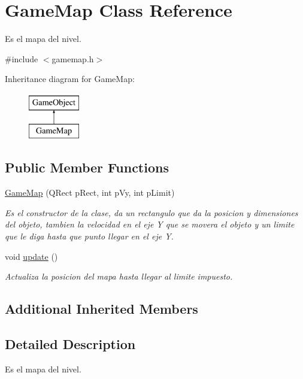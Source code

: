 \hypertarget{class_game_map}{\section{Game\-Map Class Reference}
\label{class_game_map}
}


Es el mapa del nivel.  




{\ttfamily \#include $<$gamemap.\-h$>$}

Inheritance diagram for Game\-Map\-:\begin{figure}[H]
\begin{center}
\leavevmode
\includegraphics[height=2.000000cm]{class_game_map}
\end{center}
\end{figure}
\subsection*{Public Member Functions}
\begin{DoxyCompactItemize}
\item 
\hyperlink{class_game_map_aa62bdfa76f7c48dc6b384870491747c7}{Game\-Map} (Q\-Rect p\-Rect, int p\-Vy, int p\-Limit)
\begin{DoxyCompactList}\small\item\em Es el constructor de la clase, da un rectangulo que da la posicion y dimensiones del objeto, tambien la velocidad en el eje Y que se movera el objeto y un limite que le diga hasta que punto llegar en el eje Y. \end{DoxyCompactList}\item 
void \hyperlink{class_game_map_a6497b5f848c5ac2945c0beabb896bead}{update} ()
\begin{DoxyCompactList}\small\item\em Actualiza la posicion del mapa hasta llegar al limite impuesto. \end{DoxyCompactList}\end{DoxyCompactItemize}
\subsection*{Additional Inherited Members}


\subsection{Detailed Description}
Es el mapa del nivel. 

